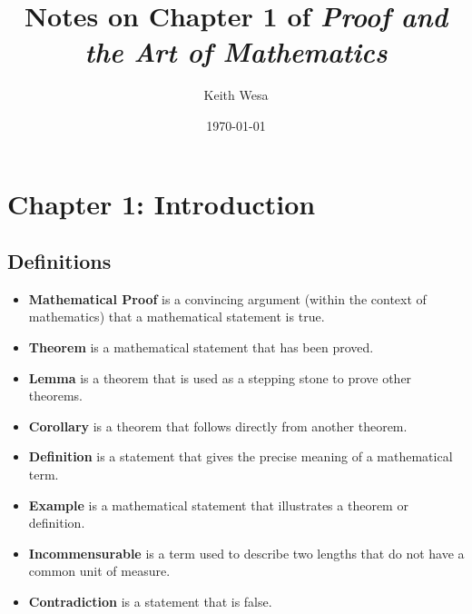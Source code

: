 \documentclass{article}
\begin{document}
\title{Notes on Chapter 1 of \textit{Proof and the Art of Mathematics}}
\author{Keith Wesa}
\date{\today}
\maketitle

\section{Chapter 1: Introduction}
    \subsection{Definitions}
    \begin{itemize}
        \item \textbf{Mathematical Proof} is a convincing argument 
        (within the context of mathematics) that a mathematical statement is true.
        \item \textbf{Theorem} is a mathematical statement that has been proved.
        \item \textbf{Lemma} is a theorem that is used as a stepping stone to prove other theorems.
        \item \textbf{Corollary} is a theorem that follows directly from another theorem.
        \item \textbf{Definition} is a statement that gives the precise meaning of a mathematical term.
        \item \textbf{Example} is a mathematical statement that illustrates a theorem or definition.
        \item \textbf{Incommensurable} is a term used to describe two lengths that do not have a common unit of measure.
        \item \textbf{Contradiction} is a statement that is false.
    \end{itemize}
\end{document}
